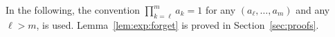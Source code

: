 %
%
In the following, the convention  $\prod_{k=\ell}^{m}a_k = 1$ for any $(a_{\ell},\ldots,a_m)$ and any $\ell>m$, is used. Lemma~\ref{lem:exp:forget} is proved in Section~\ref{sec:proofs}.

